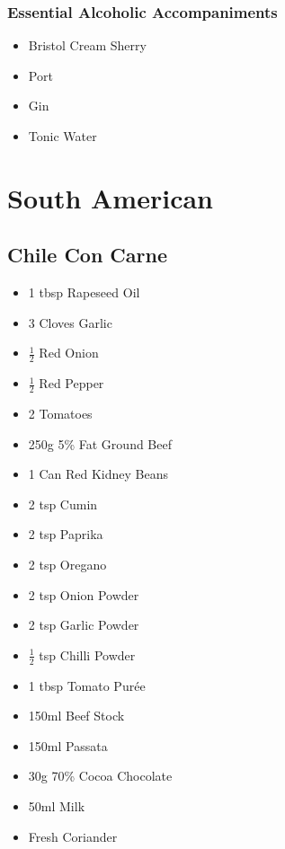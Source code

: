 \documentclass[11pt, english]{article}
\begin{document}
		\subsubsection*{Essential Alcoholic Accompaniments}

	\begin{itemize}
        \setlength\itemsep{0cm}
		\item Bristol Cream Sherry
		\item Port
		\item Gin
		\item Tonic Water
	\end{itemize}

\newpage

\section{South American}

	\subsection{Chile Con Carne}

	\begin{itemize}
	\setlength\itemsep{0cm}
		\item 1 tbsp Rapeseed Oil
		\item 3 Cloves Garlic
		\item $\frac{1}{2}$ Red Onion
		\item $\frac{1}{2}$ Red Pepper
		\item 2 Tomatoes
		\item 250g 5\% Fat Ground Beef
		\item 1 Can Red Kidney Beans
		\item 2 tsp Cumin
		\item 2 tsp Paprika
		\item 2 tsp Oregano
		\item 2 tsp Onion Powder
		\item 2 tsp Garlic Powder
		\item $\frac{1}{2}$ tsp Chilli Powder
		\item 1 tbsp Tomato Pur\'{e}e
		\item 150ml Beef Stock
		\item 150ml Passata
		\item 30g 70\% Cocoa Chocolate
		\item 50ml Milk
		\item Fresh Coriander
	\end{itemize}
\end{document}
